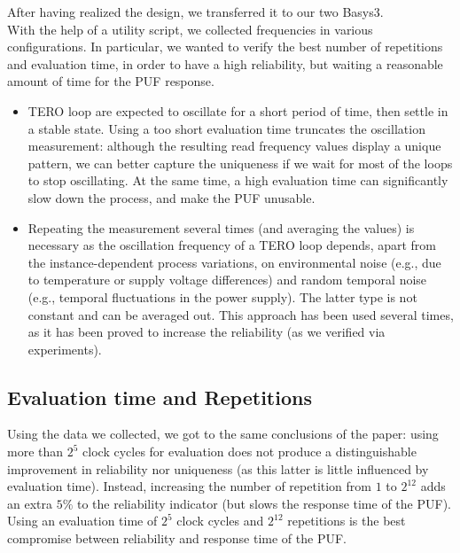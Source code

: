After having realized the design, we transferred it to our two Basys3. \\
With the help of a utility script, we collected frequencies in various configurations. 
In particular, we wanted to verify the best number of repetitions and evaluation time,
in order to have a high reliability, but waiting a reasonable amount of
time for the PUF response. \\
\begin{itemize}
    \item TERO loop are expected to oscillate for a short period of time, then settle in a stable state.
    Using a too short evaluation time truncates the oscillation measurement: although the resulting read
    frequency values display a unique pattern, we can better capture the uniqueness  
    if we wait for most of the loops to stop oscillating. At the same time, a high evaluation time
    can significantly slow down the process, and make the PUF unusable.
    \item Repeating the measurement several times (and averaging the values) is necessary as the
    oscillation frequency of a TERO loop depends, apart from the instance-dependent process variations, on environmental
    noise (e.g., due to temperature or supply voltage differences) and random temporal noise 
    (e.g., temporal fluctuations in the power supply). The latter type is not constant and can be
    averaged out. This approach has been used several times, as it has been proved to increase the reliability
    (as we verified via experiments).
\end{itemize}

\subsection{Evaluation time and Repetitions}

Using the data we collected, we got to the same conclusions of the paper: using more than $ 2^5 $
clock cycles for evaluation does not produce a distinguishable improvement in reliability nor uniqueness 
(as this latter is little influenced by evaluation time). Instead, increasing the number of repetition
from $ 1 $ to $ 2^{12} $ adds an extra $ 5\% $ to the reliability indicator (but slows the response time of the PUF). \\
Using an evaluation time of $ 2^5 $ clock cycles and $ 2^{12} $ repetitions
is the best compromise between reliability and response time of the PUF. \\

